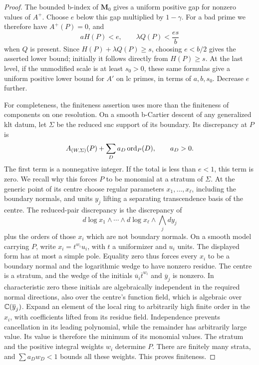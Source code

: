 \begin{proof}
The bounded b-index of $\mathbf M_0$ gives a uniform positive gap for
nonzero values of $A^+$.  Choose $e$ below this gap multiplied by
$1-\gamma$.  For a bad prime we therefore have $A^+(P)=0$, and
\[
 aH(P)<e,\qquad \lambda Q(P)<\frac{es}{b}
\]
when $Q$ is present.  Since $H(P)+\lambda Q(P)\ge s$, choosing
$e<b/2$ gives the asserted lower bound; initially it follows directly
from $H(P)\ge s$.  At the last level, if the unmodified scale is at
least $s_0>0$, these same formulas give a uniform positive lower bound
for $A'$ on lc primes, in terms of $a,b,s_0$.  Decrease $e$ further.

For completeness, the finiteness assertion uses more than the finiteness
of components on one resolution.  On a smooth b-Cartier descent of any
generalized klt datum, let $\Sigma$ be the reduced snc support of its
boundary.  Its discrepancy at $P$ is
\[
 A_{(W,\Sigma)}(P)+\sum_D a_D\operatorname{ord}_P(D),\qquad a_D>0.
\]
The first term is a nonnegative integer.  If the total is less than
$e<1$, this term is zero.  We recall why this forces $P$ to be monomial
at a stratum of $\Sigma$.  At the generic point of its centre choose
regular parameters $x_1,\ldots,x_\ell$, including the boundary normals,
and units $y_j$ lifting a separating transcendence basis of the centre.
The reduced-pair discrepancy is the discrepancy of
\[
 d\log x_1\wedge\cdots\wedge d\log x_\ell
       \wedge\bigwedge_jdy_j
\]
plus the orders of those $x_i$ which are not boundary normals.
On a smooth model carrying $P$, write $x_i=t^{w_i}u_i$, with $t$ a
uniformizer and $u_i$ units.  The displayed form has at most a simple
pole.  Equality zero thus forces every $x_i$ to be a boundary normal
and the logarithmic wedge to have nonzero residue.  The centre is a
stratum, and the wedge of the initials
$\overline u_i\overline t^{w_i}$ and $\overline y_j$ is nonzero.
In characteristic zero these initials are algebraically independent
in the required normal directions, also over the centre's function
field, which is algebraic over $\mathbb C(\overline y_j)$.  Expand an element
of the local ring to arbitrarily high finite order in the $x_i$, with
coefficients lifted from its residue field.  Independence prevents
cancellation in its leading polynomial, while the remainder has
arbitrarily large value.  Its value is therefore the minimum of its
monomial values.  The stratum and the positive integral weights $w_i$
determine $P$.  There are finitely many strata, and
$\sum a_Dw_D<1$ bounds all these weights.  This proves finiteness.


\end{proof}
